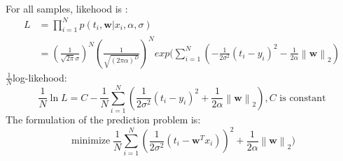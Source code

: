 \documentclass{article}
\newcommand{\norm}[2]{\left\| #1 \right\|_{#2}}
\DeclareMathOperator*{\minimize}{minimize}
\begin{document}
\begin{enumerate}[(1)]
\begin{equation}
\begin{aligned}
	\end{aligned}
	\end{equation}
	For all samples, likehood is :\\
	\begin{equation}
		\begin{aligned}
		L &= {\displaystyle \prod_{i=1}^{N}} p(t_i,\bm{w}|x_i,\alpha,\sigma)\\
		&=(\frac{1}{\sqrt{2\pi}\sigma})^N(\frac{1}{\sqrt{(2\pi\alpha)^D}})^N exp({\displaystyle \sum_{i=1}^{N}}(-\frac{1}{2\sigma^2}(t_i-y_i)^2 - \frac{1}{2\alpha}\norm{\bm{w}}2)
		\end{aligned}
	\end{equation}
	$\frac{1}{N}$log-likehood: \\
	$$\frac{1}{N}\ln{L} = C - \frac{1}{N}{\displaystyle \sum_{i=1}^{N}}(\frac{1}{2\sigma^2}(t_i-y_i)^2 + \frac{1}{2\alpha}\norm{\bm{w}}2), C \text{ is constant}$$
	The formulation of the prediction problem is:\\
	$$\displaystyle{\minimize\frac{1}{N}{\displaystyle \sum_{i=1}^{N}}(\frac{1}{2\sigma^2}(t_i-\bm{w}^Tx_i))^2 + \frac{1}{2\alpha}\norm{\bm{w}}2)}$$
\end{enumerate}
\end{document}
